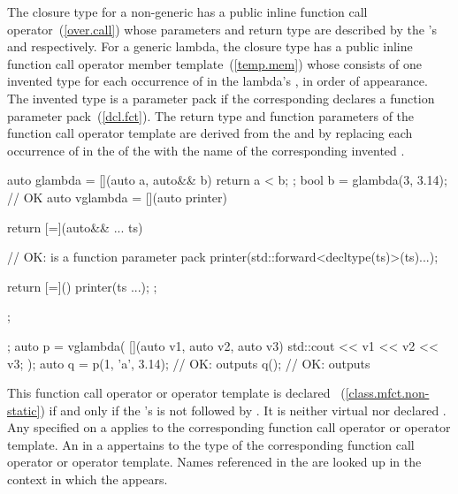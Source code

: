 \pnum
The closure type for a non-generic  has a public
inline function call operator~(\ref{over.call}) whose parameters and return type
are described by the 's
 and 
respectively.
For a generic lambda, the closure type has a public inline function call
operator member template~(\ref{temp.mem}) whose
 consists of one invented type
 for each occurrence of  in the
lambda's , in order of appearance.
The invented type  is a parameter pack if
the corresponding  declares a function
parameter pack~(\ref{dcl.fct}). The return type and function parameters of the
function call operator template are derived from the
  and
 by replacing each occurrence of
 in the  of the
 with the name of the corresponding
invented .
\enterexample
\begin{codeblock}
  auto glambda = [](auto a, auto&& b) { return a < b; };
  bool b = glambda(3, 3.14);                                  // OK
  auto vglambda = [](auto printer) {
     return [=](auto&& ... ts) {                              // OK:  is a function parameter pack
         printer(std::forward<decltype(ts)>(ts)...);

         return [=]() {
           printer(ts ...);
         };
     };
  };
  auto p = vglambda( [](auto v1, auto v2, auto v3)
                         { std::cout << v1 << v2 << v3; } );
  auto q = p(1, 'a', 3.14);                                   // OK: outputs 
  q();                                                        // OK: outputs 
\end{codeblock}
\exitexample
This function call operator or operator template is declared
~(\ref{class.mfct.non-static}) if and only if the
's  is not
followed by . It is neither virtual nor declared . Any
 specified on a 
applies to the corresponding function call operator or operator template.
An  in a  appertains
to the type of the corresponding function call operator or operator template.
\enternote Names referenced in
the  are looked up in the context in which the
 appears. \exitnote

